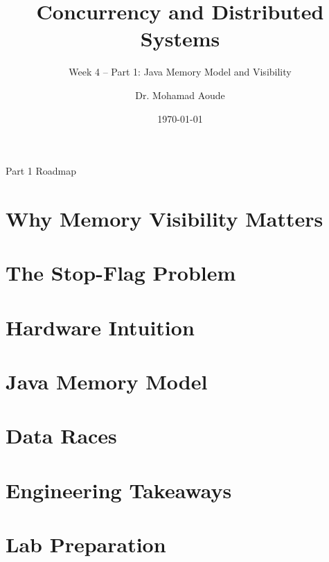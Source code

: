 \documentclass[aspectratio=169,11pt]{beamer}
\title[Week 4 -- Part 1]{Concurrency and Distributed Systems}
\subtitle{Week 4 -- Part 1: Java Memory Model and Visibility}
\author{Dr. Mohamad Aoude}
\institute{Faculty of Engineering}
\date{\today}
\begin{document}
	
	\begin{frame}
		\titlepage
	\end{frame}
	
	\begin{frame}{Part 1 Roadmap}
		\tableofcontents
	\end{frame}
	
	\section{Why Memory Visibility Matters}
	\section{The Stop-Flag Problem}
	\section{Hardware Intuition}
	\section{Java Memory Model}
	\section{Data Races}
	\section{Engineering Takeaways}
	\section{Lab Preparation}
	
\end{document}

